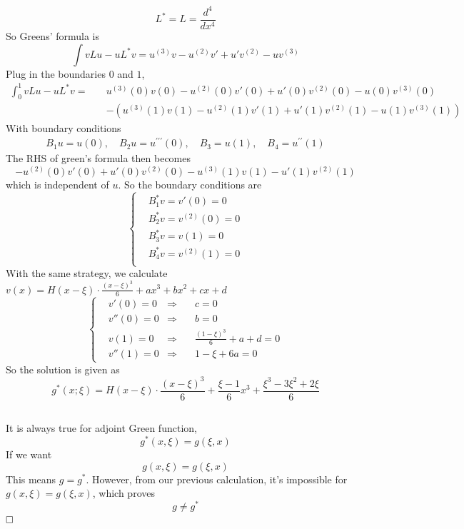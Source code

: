 \documentclass{article}
\newcommand{\qedhere}{$\hfill\ensuremath{\square}$}
\begin{document}
\subsection{}
\[
	L^* = L =  \frac{d^4}{dx^4}
\]	
So Greens' formula is
\[
	\int vLu-uL^*v = u^{(3)}v - u^{(2)}v' + u'v^{(2)}-uv^{(3)}
\]
Plug in the boundaries $0$ and $1$,
\[\begin{aligned}
	\int_0^1 vLu-uL^*v =\quad& u^{(3)}(0)v(0) - u^{(2)}(0)v'(0) + u'(0)v^{(2)}(0)-u(0)v^{(3)}(0)\\& - \left(u^{(3)}(1)v(1) - u^{(2)}(1)v'(1) + u'(1)v^{(2)}(1)-u(1)v^{(3)}(1)\right)
\end{aligned}
\]
With boundary conditions 
\begin{align*}
B_{1} u=u(0), \quad B_{2} u=u^{\prime \prime \prime}(0), \quad B_{3}=u(1), \quad B_{4}=u^{\prime \prime}(1)
\end{align*}
The RHS of green's formula then becomes
\[
	- u^{(2)}(0)v'(0) + u'(0)v^{(2)}(0)-u^{(3)}(1)v(1)-u'(1)v^{(2)}(1)
\]
which is independent of $u$. So the boundary conditions are 
\[
	\left\{
	\begin{aligned}
	&B_1^* v = v'(0) = 0\\
	&B_2^* v = v^{(2)}(0) = 0\\
	&B_3^* v = v(1) = 0\\
	&B_4^* v = v^{(2)}(1) = 0\\
	\end{aligned}
	\right.
\]
With the same strategy, we calculate $v(x) = H(x-\xi) \cdot \frac{(x-\xi)^3}{6}+ a x^3 + bx^2+cx+d$
\[\left\{
	\begin{aligned}
	&v'(0) = 0     &\Rightarrow \quad& c = 0\\
	&v''(0) = 0  &\Rightarrow \quad&b = 0 \\
	&v(1) = 0     &\Rightarrow \quad&\frac{(1-\xi)^3}{6}+a+d = 0\\
	&v''(1) = 0   &\Rightarrow \quad&1-\xi+6a = 0 
	\end{aligned}
  \right.
\]
So the solution is given as 
\[
	g^*(x;\xi) = H(x-\xi) \cdot \frac{(x-\xi)^3}{6}+ \frac{\xi-1}{6} x^3+\frac{\xi^3-3\xi^2+2\xi}{6}
\]
\subsection{}
It is always true for adjoint Green function,
\[
	g^*(x,\xi) = g(\xi,x)
\]
If we want 
\[
	g(x,\xi) = g(\xi,x)
\]
This means $g = g^*$. However, from our previous calculation, it's impossible for $g(x,\xi) = g(\xi,x)$, which proves
\[
	g \neq g^*
\]
\qedhere
\end{document}
